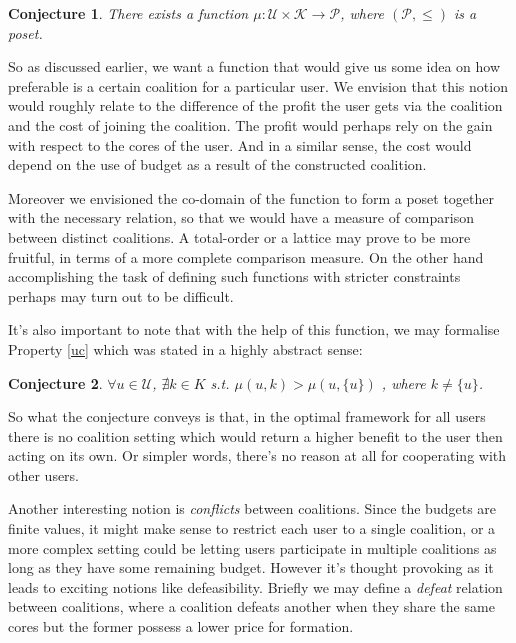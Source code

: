 \documentclass{article}
\newtheorem{conjecture}{Conjecture}
\begin{document}
\begin{conjecture}
There exists a function $\mu: \mathcal{U} \times \mathcal{K} \rightarrow \mathcal{P}$, where $(\mathcal{P}, \le)$ is a poset.
\end{conjecture}

So as discussed earlier, we want a function that would give us some idea on how preferable is a certain coalition for a particular user. We envision that this notion would roughly relate to the difference of the profit the user gets via the coalition and the cost of joining the coalition. The profit would perhaps rely on the gain with respect to the cores of the user. And in a similar sense, the cost would depend on the use of budget as a result of the constructed coalition. 

Moreover we envisioned the co-domain of the function to form a poset together with the necessary relation, so that we would have a measure of comparison between distinct coalitions. A total-order or a lattice may prove to be more fruitful, in terms of a more complete comparison measure. On the other hand accomplishing the task of defining such functions with stricter constraints perhaps may turn out to be difficult.   

It's also important to note that with the help of this function, we may formalise Property \ref{uc} which was stated in a highly abstract sense:

\begin{conjecture}
$\forall u \in \mathcal{U}$, $\nexists k \in K$ s.t. $\mu(u, k) > \mu(u, \{u\})$ , where $k \neq \{u\}$.
\end{conjecture}

So what the conjecture conveys is that, in the optimal framework for all users there is no coalition setting which would return a higher benefit to the user then acting on its own. Or simpler words, there's no reason at all for cooperating with other users.  


Another interesting notion is \emph{conflicts} between coalitions. Since the budgets are finite values, it might make sense to restrict each user to a single coalition, or a more complex setting could be letting users participate in multiple coalitions as long as they have some remaining budget. However it's thought provoking as it leads to exciting notions like defeasibility. Briefly we may define a \emph{defeat} relation between coalitions, where a coalition defeats another when they share the same cores but the former possess a lower price for formation.
\end{document}
